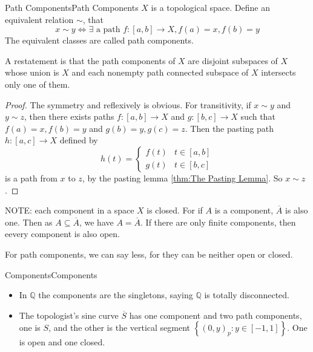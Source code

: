 \documentclass[../main.tex]{subfiles}
\begin{document}
\begin{definition}{Path Components}{Path Components}
$X$ is a topological space. Define an equivalent relation $\sim$, that
\begin{equation*}
	x\sim y \Leftrightarrow \exists \text{ a path } f:[a,b] \rightarrow X, f(a) = x, f(b) = y
\end{equation*}
The equivalent classes are called path components.

A restatement is that the path components of $X$ are disjoint subspaces of $X$ whose union is $X$ and each nonempty path connected subspace of $X$ intersects only one of them.
\end{definition}
\begin{proof}
	The symmetry and reflexively is obvious. For transitivity, if $x\sim y$ and $y\sim z$, then there exists paths $f:[a,b] \rightarrow X$ and $g:[b,c] \rightarrow X$ such that $f(a) = x, f(b) = y$ and $g(b) = y, g(c) = z$. Then the pasting path $h:[a,c] \rightarrow X$ defined by
	\begin{equation*}
	h(t) = 
	\begin{cases}
		f(t) & t\in [a,b] \\
		g(t) & t\in [b,c]
	\end{cases}
	\end{equation*}
	is a path from $x$ to $z$, by the pasting lemma \ref{thm:The Pasting Lemma}. So $x\sim z$.
\end{proof}

\begin{remark}
NOTE: each component in a space $X$ is closed. For if $A$ is a component, $\overline{A}$ is also one. Then as $A \subseteq \overline{A}$, we have $A = \overline{A}$. If there are only finite components, then  eevery component is also open.

For path components, we can say less, for they can be neither open or closed.
\end{remark}

\begin{example}{Components}{Components}
\begin{itemize}
\item In $\mathbb{Q}$ the components are the singletons, saying $\mathbb{Q}$ is totally disconnected.
\item The topologist's sine curve $\overline{S}$ has one component and two path components, one is $S$, and the other is the vertical segment $\left\{ (0,y)_p : y\in [-1,1] \right\}$. One is open and one closed.
\end{itemize}
\end{example}
\end{document}
